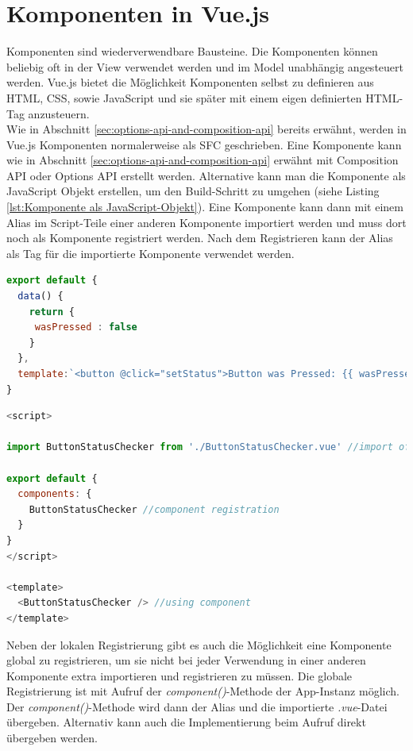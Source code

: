 \section{Komponenten in Vue.js}\label{sec:komponenten-in-vue.js}
Komponenten sind wiederverwendbare Bausteine.
Die Komponenten können beliebig oft in der View verwendet werden und im Model unabhängig angesteuert werden.
Vue.js bietet die Möglichkeit Komponenten selbst zu definieren aus HTML, CSS, sowie JavaScript und sie später mit einem
eigen definierten HTML-Tag anzusteuern. \cite[S. 11-12]{steyer2019}
\\
Wie in Abschnitt \ref{sec:options-api-and-composition-api} bereits erwähnt, werden in Vue.js Komponenten normalerweise als SFC geschrieben.
Eine Komponente kann wie in Abschnitt \ref{sec:options-api-and-composition-api} erwähnt mit Composition API oder Options API
erstellt werden.
Alternative kann man die Komponente als JavaScript Objekt erstellen, um den Build-Schritt zu umgehen (siehe Listing \ref{lst:Komponente als JavaScript-Objekt}).
Eine Komponente kann dann mit einem Alias im Script-Teile einer anderen Komponente importiert werden und muss dort noch als Komponente
registriert werden.
Nach dem Registrieren kann der Alias als Tag für die importierte Komponente verwendet werden. \cite{vueComponents}

\newpage

\begin{lstlisting}[caption={Komponente als JavaScript Objekt},language=javascript,label={lst:Komponente als JavaScript-Objekt}]
export default {
  data() {
    return {
     wasPressed : false
    }
  },
  template:`<button @click="setStatus">Button was Pressed: {{ wasPressed }}</button>`
}
\end{lstlisting}


\begin{lstlisting}[caption={Verwendung einer Komponente},language=javascript,label={lst:Verwendung einer Komponente}]
<script>

import ButtonStatusChecker from './ButtonStatusChecker.vue' //import of component

export default {
  components: {
    ButtonStatusChecker //component registration
  }
}
</script>

<template>
  <ButtonStatusChecker /> //using component
</template>
\end{lstlisting}

Neben der lokalen Registrierung gibt es auch die Möglichkeit eine Komponente global
zu registrieren, um sie nicht bei jeder Verwendung in einer anderen Komponente
extra importieren und registrieren zu müssen.
Die globale Registrierung ist mit Aufruf der \emph{component()}-Methode der App-Instanz möglich.
Der \emph{component()}-Methode wird dann der Alias und die importierte \emph{.vue}-Datei übergeben.
Alternativ kann auch die Implementierung beim Aufruf direkt übergeben werden. \cite{vueComponentsRegistration}

